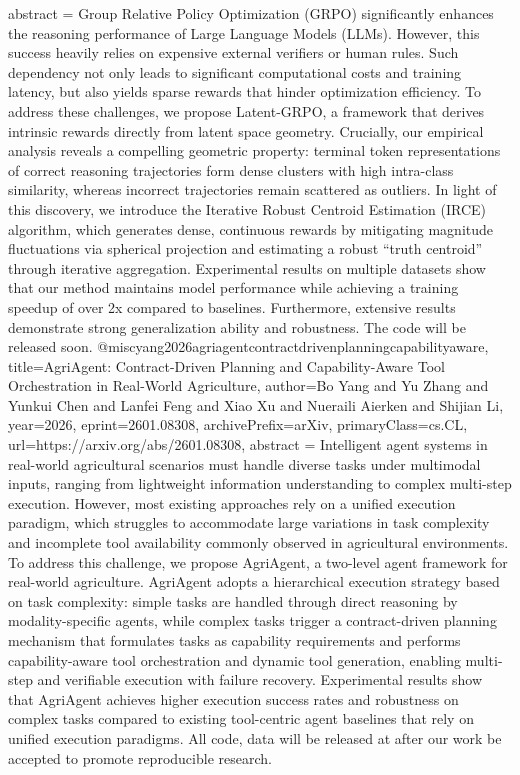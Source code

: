 {      abstract = {Group Relative Policy Optimization (GRPO) significantly enhances the reasoning performance of Large Language Models (LLMs). However, this success heavily relies on expensive external verifiers or human rules. Such dependency not only leads to significant computational costs and training latency, but also yields sparse rewards that hinder optimization efficiency. To address these challenges, we propose Latent-GRPO, a framework that derives intrinsic rewards directly from latent space geometry. Crucially, our empirical analysis reveals a compelling geometric property: terminal token representations of correct reasoning trajectories form dense clusters with high intra-class similarity, whereas incorrect trajectories remain scattered as outliers. In light of this discovery, we introduce the Iterative Robust Centroid Estimation (IRCE) algorithm, which generates dense, continuous rewards by mitigating magnitude fluctuations via spherical projection and estimating a robust ``truth centroid'' through iterative aggregation. Experimental results on multiple datasets show that our method maintains model performance while achieving a training speedup of over 2x compared to baselines. Furthermore, extensive results demonstrate strong generalization ability and robustness. The code will be released soon.}
}@misc{yang2026agriagentcontractdrivenplanningcapabilityaware,
      title={AgriAgent: Contract-Driven Planning and Capability-Aware Tool Orchestration in Real-World Agriculture}, 
      author={Bo Yang and Yu Zhang and Yunkui Chen and Lanfei Feng and Xiao Xu and Nueraili Aierken and Shijian Li},
      year={2026},
      eprint={2601.08308},
      archivePrefix={arXiv},
      primaryClass={cs.CL},
      url={https://arxiv.org/abs/2601.08308},
      abstract = {Intelligent agent systems in real-world agricultural scenarios must handle diverse tasks under multimodal inputs, ranging from lightweight information understanding to complex multi-step execution. However, most existing approaches rely on a unified execution paradigm, which struggles to accommodate large variations in task complexity and incomplete tool availability commonly observed in agricultural environments. To address this challenge, we propose AgriAgent, a two-level agent framework for real-world agriculture. AgriAgent adopts a hierarchical execution strategy based on task complexity: simple tasks are handled through direct reasoning by modality-specific agents, while complex tasks trigger a contract-driven planning mechanism that formulates tasks as capability requirements and performs capability-aware tool orchestration and dynamic tool generation, enabling multi-step and verifiable execution with failure recovery. Experimental results show that AgriAgent achieves higher execution success rates and robustness on complex tasks compared to existing tool-centric agent baselines that rely on unified execution paradigms. All code, data will be released at after our work be accepted to promote reproducible research.}
}
